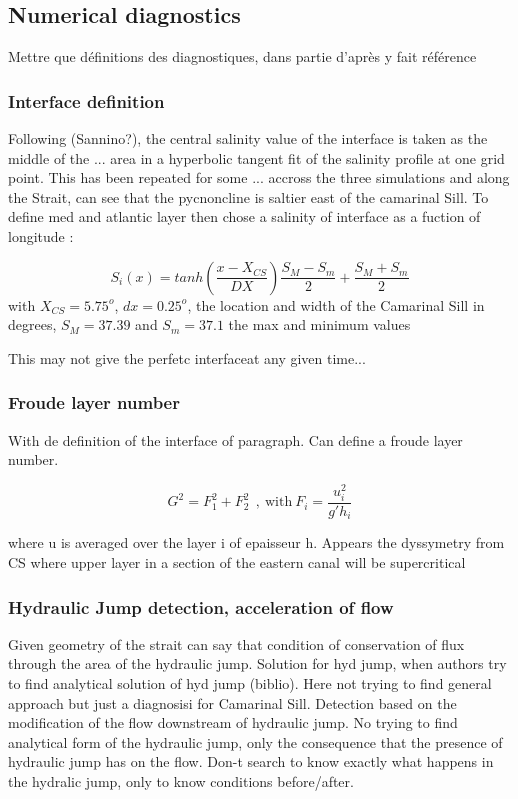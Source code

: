 \subsection{Numerical diagnostics}
Mettre que définitions des diagnostiques, dans partie d'après y fait référence

\subsubsection{Interface definition}

Following (Sannino?), the central salinity value of the interface is taken as the middle of the ... area in a hyperbolic tangent fit of the salinity profile at one grid point. This has been repeated for some ... accross the three simulations and along the Strait, can see that the pycnoncline is saltier east of the camarinal Sill. To define med and atlantic layer then chose a salinity of interface as a fuction of longitude :

\begin{equation}
	S_i(x)=tanh(\frac{x-X_{CS}}{DX})\frac{S_M-S_m}{2}+\frac{S_M+S_m}{2}
\end{equation}
with $X_{CS}=5.75^o$, $dx=0.25^o$, the location and width of the Camarinal Sill in degrees, $S_M=37.39$ and $S_m=37.1$ the max and minimum values

This may not give the perfetc interfaceat any given time...

\subsubsection{Froude layer number}

With de definition of the interface of paragraph. Can define a froude layer number. 

\begin{equation}
G^2=F_1^2+F_2^2 \ \ , \ \text{with} \ F_i=\frac{u_i^2}{g'h_i}
\end{equation}

where u is averaged over the layer i of epaisseur h. Appears the dyssymetry from CS where upper layer in a section of the eastern canal will be supercritical


\subsubsection{Hydraulic Jump detection, acceleration of flow}
Given geometry of the strait can say that condition of conservation of flux through the area of the hydraulic jump. Solution for hyd jump, when authors try to find analytical solution of hyd jump (biblio). Here not trying to find general approach but just a diagnosisi for Camarinal Sill. Detection based on the modification of the flow downstream of hydraulic jump. No trying to find analytical form of the hydraulic jump, only the consequence that the presence of hydraulic jump has on the flow. Don-t search to know exactly what happens in the hydralic jump, only to know conditions before/after.

